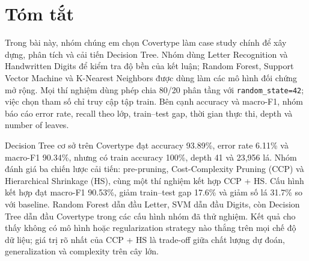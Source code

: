 \chapter*{Tóm tắt}

Trong bài này, nhóm chúng em chọn Covertype làm case study chính để xây dựng, phân tích và cải tiến Decision Tree. Nhóm dùng Letter Recognition và Handwritten Digits để kiểm tra độ bền của kết luận; Random Forest, Support Vector Machine và K-Nearest Neighbors được dùng làm các mô hình đối chứng mở rộng. Mọi thí nghiệm dùng phép chia 80/20 phân tầng với \texttt{random\_state=42}; việc chọn tham số chỉ truy cập tập train. Bên cạnh accuracy và macro-F1, nhóm báo cáo error rate, recall theo lớp, train--test gap, thời gian thực thi, depth và number of leaves.

Decision Tree cơ sở trên Covertype đạt accuracy 93.89\%, error rate 6.11\% và macro-F1 90.34\%, nhưng có train accuracy 100\%, depth 41 và 23,956 lá. Nhóm đánh giá ba chiến lược cải tiến: pre-pruning, Cost-Complexity Pruning (CCP) và Hierarchical Shrinkage (HS), cùng một thí nghiệm kết hợp CCP + HS. Cấu hình kết hợp đạt macro-F1 90.53\%, giảm train--test gap 17.6\% và giảm số lá 31.7\% so với baseline. Random Forest dẫn đầu Letter, SVM dẫn đầu Digits, còn Decision Tree dẫn đầu Covertype trong các cấu hình nhóm đã thử nghiệm. Kết quả cho thấy không có mô hình hoặc regularization strategy nào thắng trên mọi chế độ dữ liệu; giá trị rõ nhất của CCP + HS là trade-off giữa chất lượng dự đoán, generalization và complexity trên cây lớn.

\clearpage
